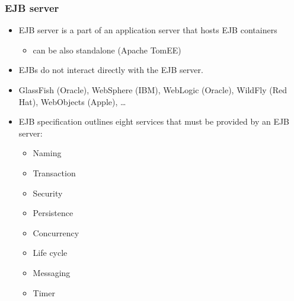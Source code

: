 \documentclass[10pt,xcolor=pdflatex]{beamer}
\begin{document}
\begin{frame}\frametitle{EJB server}
	\begin{itemize}
		\item EJB server is a part of an application server that hosts EJB containers
          \begin{itemize}
            \item can be also standalone (Apache TomEE)
          \end{itemize}
		\item EJBs do not interact directly with the EJB server.
		\item GlassFish (Oracle), WebSphere (IBM), WebLogic (Oracle), WildFly (Red Hat), WebObjects (Apple), \ldots
		\item EJB specification outlines eight services that must be provided by an EJB server:
        \begin{itemize}
        	\item Naming
        	\item Transaction
        	\item Security
        	\item Persistence
        	\item Concurrency
        	\item Life cycle
        	\item Messaging
        	\item Timer 
        \end{itemize}
	\end{itemize}
\end{frame}
\end{document}
